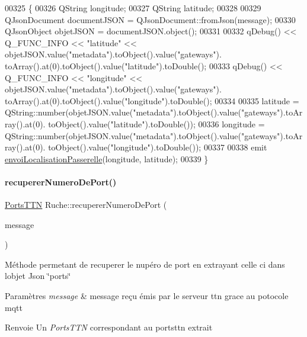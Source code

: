 \begin{DoxyCode}
00325 \{
00326     QString longitude;
00327     QString latitude;
00328 
00329     QJsonDocument documentJSON = QJsonDocument::fromJson(message);
00330     QJsonObject objetJSON = documentJSON.object();
00331 
00332     qDebug() << Q\_FUNC\_INFO << \textcolor{stringliteral}{"latitude"} << objetJSON.value(\textcolor{stringliteral}{"metadata"}).toObject().value(\textcolor{stringliteral}{"gateways"}).
      toArray().at(0).toObject().value(\textcolor{stringliteral}{"latitude"}).toDouble();
00333     qDebug() << Q\_FUNC\_INFO << \textcolor{stringliteral}{"longitude"} << objetJSON.value(\textcolor{stringliteral}{"metadata"}).toObject().value(\textcolor{stringliteral}{"gateways"}).
      toArray().at(0).toObject().value(\textcolor{stringliteral}{"longitude"}).toDouble();
00334 
00335     latitude = QString::number(objetJSON.value(\textcolor{stringliteral}{"metadata"}).toObject().value(\textcolor{stringliteral}{"gateways"}).toArray().at(0).
      toObject().value(\textcolor{stringliteral}{"latitude"}).toDouble());
00336     longitude = QString::number(objetJSON.value(\textcolor{stringliteral}{"metadata"}).toObject().value(\textcolor{stringliteral}{"gateways"}).toArray().at(0).
      toObject().value(\textcolor{stringliteral}{"longitude"}).toDouble());
00337 
00338     emit \hyperlink{class_ruche_a2a0f122bfd939419f40facf41e91fe30}{envoiLocalisationPasserelle}(longitude, latitude);
00339 \}
\end{DoxyCode}
\mbox{\label{class_ruche_a157782119650e2bd196612c3fa66972c}} 
\paragraph{\texorpdfstring{recuperer\+Numero\+De\+Port()}{recupererNumeroDePort()}}
{\footnotesize\ttfamily \hyperlink{parametres_8h_a0fe68caa1e9147addc96657cc822b937}{Ports\+T\+TN} Ruche\+::recuperer\+Numero\+De\+Port (\begin{DoxyParamCaption}\item[{Q\+Byte\+Array}]{message }\end{DoxyParamCaption})\hspace{0.3cm}{\ttfamily [private]}}

Méthode permetant de recuperer le nupéro de port en extrayant celle ci dans l\textquotesingle{}objet Json \char`\"{}ports\char`\"{} 
\begin{DoxyParams}{Paramètres}
{\em message} & message reçu émis par le serveur ttn grace au potocole mqtt \\
\hline
\end{DoxyParams}
\begin{DoxyReturn}{Renvoie}
Un {\itshape Ports\+T\+TN} correspondant au portsttn extrait 
\end{DoxyReturn}


